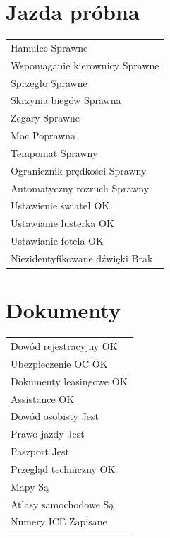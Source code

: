 \documentclass{article}
\begin{document}
\begin{multicols}{2}
\section{Jazda próbna}
\begin{tabularx}{\columnwidth}{|X|}
\hline
Hamulce \dotfill Sprawne \\
Wspomaganie kierownicy \dotfill Sprawne \\
Sprzęgło \dotfill Sprawne \\
Skrzynia biegów \dotfill Sprawna \\
Zegary \dotfill Sprawne \\
Moc \dotfill Poprawna \\
Tempomat \dotfill Sprawny \\
Ogranicznik prędkości \dotfill Sprawny \\
Automatyczny rozruch \dotfill Sprawny \\
Ustawienie świateł \dotfill OK \\
Ustawianie lusterka \dotfill OK \\
Ustawianie fotela \dotfill OK \\
Niezidentyfikowane dźwięki \dotfill Brak \\
\hline
\end{tabularx}

\section{Dokumenty}
\begin{tabularx}{\columnwidth}{|X|}
\hline
Dowód rejestracyjny \dotfill OK \\
Ubezpieczenie OC \dotfill OK\\
Dokumenty leasingowe \dotfill OK \\
Assistance \dotfill OK \\
Dowód osobisty \dotfill Jest \\
Prawo jazdy \dotfill Jest \\
Paszport \dotfill Jest \\
Przegląd techniczny \dotfill OK \\
Mapy \dotfill Są \\
Atlasy samochodowe \dotfill Są \\
Numery ICE \dotfill Zapisane \\
\hline
\end{tabularx}


\end{multicols}
\end{document}
